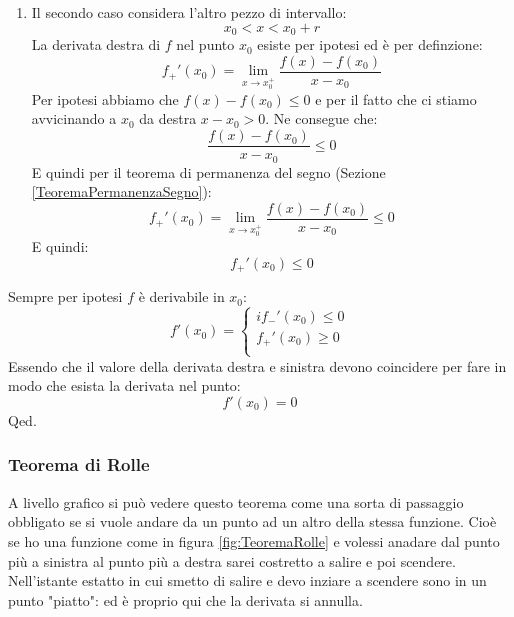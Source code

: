 {\begin{enumerate}
		\item Il secondo caso considera l'altro pezzo di intervallo:
			\begin{equation*}
				x_0< x < x_0 + r
			\end{equation*}
			La derivata destra di $f$ nel punto $x_0$ esiste per ipotesi ed è per definzione:
			\begin{equation*}
				f_+'(x_0) = \lim_{x \to x_0^+}  \dfrac{f(x) - f(x_0)}{x-x_0}
			\end{equation*}
			Per ipotesi abbiamo che $f(x) - f(x_0) \leq 0$ e per il fatto che ci stiamo avvicinando a $x_0$ da destra $x - x_0 > 0$. Ne consegue che:
			\begin{equation*}
				\dfrac{f(x) - f(x_0)}{x-x_0} \leq 0
			\end{equation*}
			E quindi per il teorema di permanenza del segno (Sezione \ref{TeoremaPermanenzaSegno}):
			\begin{equation*}
				f_+'(x_0) = \lim_{x \to x_0^+}  \dfrac{f(x) - f(x_0)}{x-x_0} \leq 0
			\end{equation*}
			E quindi:
			\begin{equation*}
				f_+'(x_0) \leq 0
			\end{equation*}
	\end{enumerate}
	Sempre per ipotesi $f$ è derivabile in $x_0$:
	\begin{equation*}
		f'(x_0) =
		\begin{cases*}
i			f_-' (x_0) \leq 0\\[10pt]
			f_+' (x_0) \geq 0\\
		\end{cases*}
	\end{equation*}
	Essendo che il valore della derivata destra e sinistra devono coincidere per fare in modo che esista la derivata nel punto:
	\begin{equation*}
		f'(x_0) = 0
	\end{equation*}
	\hfill Qed.
}

\subsubsection{Teorema di Rolle} \label{sec:TeoremaRolle}

\thm {
Data una funione $f:[a,b] \to \mathbb{R}$ con le seguenti proprietà:
\begin{enumerate}
    \item $f$ è continua su $[a,b]$
    \item $f$ è derivabile su $]a,b[$
    \item $f(a) = f(b)$
\end{enumerate}
Allora:
\begin{equation*}
    \exists \,c \in ]a,b[ \;: f'(c) = 0
\end{equation*}
}
A livello grafico si può vedere questo teorema come una sorta di passaggio obbligato se si vuole andare da un punto ad un altro della stessa funzione. Cioè se ho una funzione come in figura \ref{fig:TeoremaRolle} e volessi anadare dal punto più a sinistra al punto più a destra sarei costretto a salire e poi scendere. Nell'istante estatto in cui smetto di salire e devo inziare a scendere sono in un punto "piatto": ed è proprio qui che la derivata si annulla.

